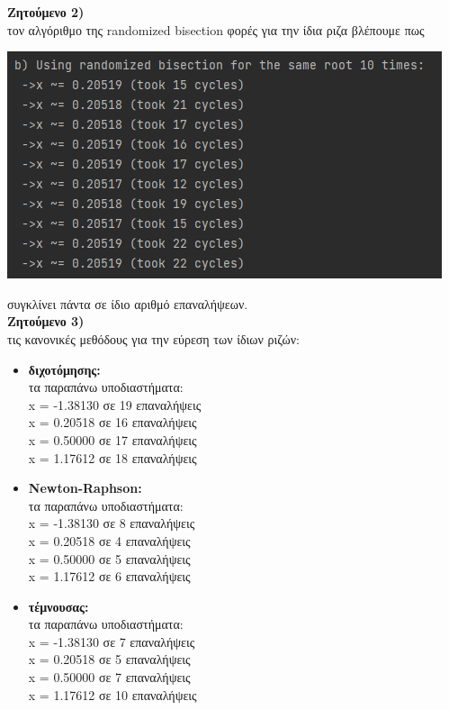 \documentclass{article}
\newcommand{\lt}{\latintext}
\newcommand{\gt}{\greektext}
\begin{document}
\textbf{\gt Ζητούμενο 2)}\\
 τον αλγόριθμο της \lt randomized bisection \gt10 φορές για την ίδια ριζα βλέπουμε πως
\begin{center}
    \includegraphics[scale=0.7]{images/output of question 2.png}        
\end{center}
 συγκλίνει πάντα σε ίδιο αριθμό επαναλήψεων.\\

\textbf{\gt Ζητούμενο 3)}\\
 τις κανονικές μεθόδους για την εύρεση των ίδιων ριζών:
\begin{itemize}
    \item \textbf{ διχοτόμησης:}\\
             τα παραπάνω υποδιαστήματα:\\
            \lt x = -1.38130 \gt σε 19 επαναλήψεις\\
            \lt x = 0.20518 \gt σε 16 επαναλήψεις\\
            \lt x = 0.50000 \gt σε 17 επαναλήψεις\\
            \lt x = 1.17612 \gt σε 18 επαναλήψεις\\
    \item \textbf{ \lt Newton-Raphson:}\\
             τα παραπάνω υποδιαστήματα:\\
            \lt x = -1.38130 \gt σε 8 επαναλήψεις\\
            \lt x = 0.20518 \gt σε 4 επαναλήψεις\\
            \lt x = 0.50000 \gt σε 5 επαναλήψεις\\
            \lt x = 1.17612 \gt σε 6 επαναλήψεις\\
    \item \textbf{ τέμνουσας:}\\
             τα παραπάνω υποδιαστήματα:\\
            \lt x = -1.38130 \gt σε 7 επαναλήψεις\\
            \lt x = 0.20518 \gt σε 5 επαναλήψεις\\
            \lt x = 0.50000 \gt σε 7 επαναλήψεις\\
            \lt x = 1.17612 \gt σε 10 επαναλήψεις\\
\end{itemize}
\end{document}
